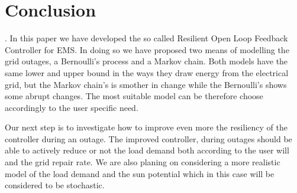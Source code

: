 \documentclass{ifacconf}
\begin{document}
 
\section{Conclusion}\label{conclusion}.
In this paper we have developed the so called Resilient Open Loop Feedback Controller for EMS. In doing so we have proposed two means of modelling the grid outages, a Bernoulli's process and a Markov chain. Both models have the same lower and upper bound in the ways they draw energy from the electrical grid, but the Markov chain's is smother in change while the Bernoulli's shows some abrupt changes. The most suitable model can be therefore choose accordingly to the user specific need.

 Our next step is to investigate how to improve even more the resiliency of the controller during an outage. The improved controller, during outages should be able to actively reduce or not the load demand both according to the user will and the grid repair rate. We are also planing on considering a more realistic model of the load demand and the sun potential which in this case will be considered to be stochastic.
 

 
\end{document}

